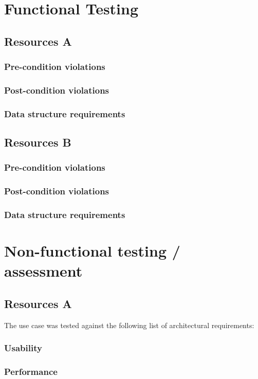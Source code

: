\documentclass[a4paper]{article}
\begin{document}
\section {Functional Testing}

\subsection {Resources A}
\subsubsection {Pre-condition violations}
\subsubsection {Post-condition violations}
\subsubsection {Data structure requirements}

\subsection {Resources B}
\subsubsection {Pre-condition violations}
\subsubsection {Post-condition violations}
\subsubsection {Data structure requirements}

\section {Non-functional testing / assessment}
\subsection {Resources A}
The use case was tested against the following list of architectural requirements:
\subsubsection {Usability}
\subsubsection {Performance}
\end{document}
